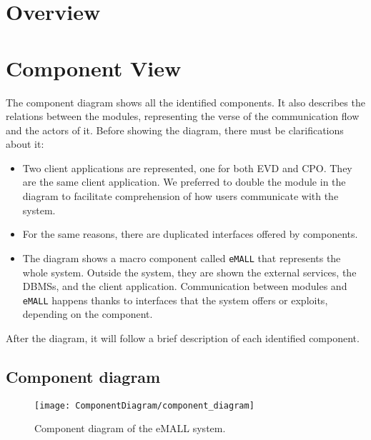 \section{Overview}
\label{sec: overview}%


\section{Component View}
\label{sec: component_view}%
The component diagram shows all the identified components.
It also describes the relations between the modules, representing the verse of the communication flow and the actors of it.
Before showing the diagram, there must be clarifications about it:
\begin{itemize}
    \item Two client applications are represented, one for both EVD and CPO. They are the same client application.
    We preferred to double the module in the diagram to facilitate comprehension of how users communicate with the system.
    \item For the same reasons, there are duplicated interfaces offered by components.
    \item The diagram shows a macro component called \verb|eMALL| that represents the whole system.
    Outside the system, they are shown the external services, the DBMSs, and the client application.
    Communication between modules and \verb|eMALL| happens thanks to interfaces that the system offers or exploits, depending on the component.
\end{itemize}
After the diagram, it will follow a brief description of each identified component.

\subsection{Component diagram}
\label{subsec:component_diagram}%
\begin{figure} [H]
    \begin{center}
        \texttt{[image: ComponentDiagram/component\_diagram]}
        \caption{Component diagram of the eMALL system.}
        \label{fig: cd}
    \end{center}
\end{figure}

